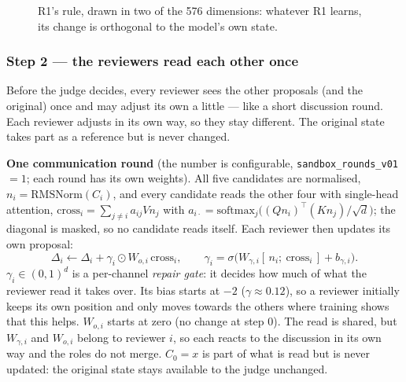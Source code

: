 \documentclass[a4paper,12pt,parskip=half,headsepline]{scrartcl}
\newcommand{\code}[1]{\texttt{\small #1}}
\begin{document}
\begin{figure}[H]
\centering
{}
\caption{R1's rule, drawn in two of the 576 dimensions: whatever R1 learns, its change is orthogonal to the model's own state.}
\label{fig:r1}
\end{figure}

\subsubsection*{Step 2 --- the reviewers read each other once}

\begin{plain}
Before the judge decides, every reviewer sees the other proposals (and the original)
once and may adjust its own a little --- like a short discussion round. Each reviewer
adjusts in its own way, so they stay different. The original state takes part as a
reference but is never changed.
\end{plain}

\begin{tech}
\textbf{One communication round} (the number is configurable,
\code{sandbox\_rounds\_v01} $= 1$; each round has its own weights). All five candidates
are normalised, $n_i = \text{RMSNorm}(C_i)$, and every candidate reads the other four with
single-head attention, $\text{cross}_i = \sum_{j \ne i} a_{ij} V n_j$ with
$a_{i\cdot} = \text{softmax}_j\big((Q n_i)^\top (K n_j)/\sqrt d\big)$; the diagonal is
masked, so no candidate reads itself. Each reviewer then updates its own proposal:
\[
\Delta_i \leftarrow \Delta_i + \gamma_i \odot W_{o,i}\,\text{cross}_i,\qquad
\gamma_i = \sigma\big(W_{\gamma,i}[\,n_i;\ \text{cross}_i\,] + b_{\gamma,i}\big).
\]
$\gamma_i \in (0,1)^d$ is a per-channel \emph{repair gate}: it decides how much of what the
reviewer read it takes over. Its bias starts at $-2$ ($\gamma \approx 0.12$), so a reviewer
initially keeps its own position and only moves towards the others where training shows
that this helps. $W_{o,i}$ starts at zero (no change at step 0). The read is shared, but
$W_{\gamma,i}$ and $W_{o,i}$ belong to reviewer $i$, so each reacts to the discussion in its
own way and the roles do not merge. $C_0 = x$ is part of what is read but is never
updated: the original state stays available to the judge unchanged.
\end{tech}
\end{document}
